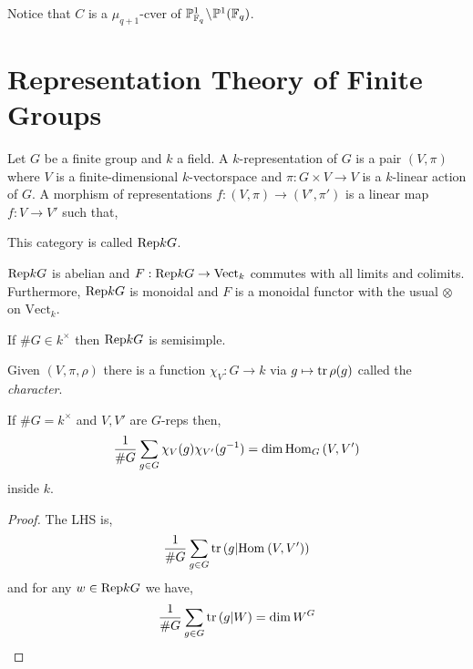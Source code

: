 \documentclass[12pt]{article}
\begin{document}
\begin{rmk}
Notice that $C$ is a $\mu_{q+1}$-cver of $\mathbb{P}^1_{\mathbb{F}_q} \! \setminus \! \mathbb{P}^1(\mathbb{F}_q)$. 
\end{rmk}

\section{Representation Theory of Finite Groups}

\newcommand{\Vect}{\mathrm{Vect}}

\begin{defn}
Let $G$ be a finite group and $k$ a field. A $k$-representation of $G$ is a pair $(V, \pi)$ where $V$ is a finite-dimensional $k$-vectorspace and $\pi : G \times V \to V$ is a $k$-linear action of $G$. A morphism of representations $f : (V, \pi) \to (V', \pi')$ is a linear map $f : V \to V'$ such that,
\begin{center}
\end{center}
This category is called $\mathrm{Rep}{k}{G}$.
\end{defn}

\begin{prop}
$\mathrm{Rep}{k}{G}$ is abelian and $F : \Rep{k}{G} \to \Vect_k$ commutes with all limits and colimits. Furthermore, $\mathrm{Rep}{k}{G}$ is monoidal and $F$ is a monoidal functor with the usual $\otimes$ on $\Vect_k$. 
\end{prop}

\begin{prop}[Maschke]
If $\# G \in k^\times$ then $\mathrm{Rep}{k}{G}$ is semisimple.
\end{prop}

\begin{defn}
Given $(V, \pi, \rho)$ there is a function $\chi_V : G \to k$ via $g \mapsto \operatorname{\mathrm{tr}}{\rho(g)}$ called the \textit{character}. 
\end{defn}

\begin{theorem}[Orthogonality]
If $\# G = k^\times$ and $V, V'$ are $G$-reps then,
\[ \frac{1}{\# G} \sum_{g \in G} \chi_V(g) \chi_{V'}(g^{-1}) = \dim \mathrm{Hom}_{G} \left( V, V' \right) \]
inside $k$.
\end{theorem}

\begin{proof}
The LHS is,
\[ \frac{1}{\# G} \sum_{g \in G} \operatorname{\mathrm{tr}}{\left( g | \mathrm{Hom}_{} \left( V, V' \right) \right)} \]
and for any $w \in \mathrm{Rep}{k}{G}$ we have,
\[ \frac{1}{\# G} \sum_{g \in G} \operatorname{\mathrm{tr}}{\left( g | W \right)} = \dim{W^G} \]
\end{proof}
\end{document}
